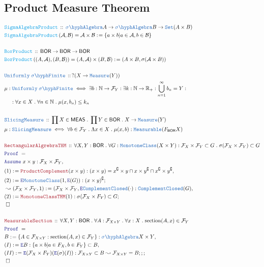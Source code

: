 \documentclass[12pt]{scrartcl}
\newcommand{\TYPE}[1]{\textcolor{NavyBlue}{\mathtt{#1}}}
\newcommand{\FUNC}[1]{\textcolor{Cerulean}{\mathtt{#1}}}
\newcommand{\LOGIC}[1]{\textcolor{Blue}{\mathtt{#1}}}
\newcommand{\THM}[1]{\textcolor{Maroon}{\mathtt{#1}}}
\renewcommand{\.}{\; . \;}
\newcommand{\de}{: \kern 0.1pc =}
\newcommand{\Act}[1]{\left( #1 \right)}
\newcommand{\Theorem}[2]{& \THM{#1} \, :: \, #2 \\ & \Proof = \\ }
\newcommand{\DeclareType}[2]{& \TYPE{#1} \, :: \, #2 \\}
\newcommand{\DefineType}[3]{& #1 : \TYPE{#2} \iff #3 \\}
\newcommand{\DeclareFunc}[2]{& \FUNC{#1} \, :: \, #2 \\}
\newcommand{\DefineNamedFunc}[4]{&  \FUNC{#1}\Act{#2} = #3 \de #4 \\}
\newcommand{\NewLine}{\\ & \kern 1pc}
\newcommand{\Page}[1]{ \begin{align*} #1 \end{align*}   }
\newcommand{\ForEach}[3]{\forall #1 : #2 \. #3 }
\newcommand{\Reals}{\mathbb{R} }
\newcommand{\Nat}{\mathbb{N} }
\newcommand{\Set}{\TYPE{Set}}
\renewcommand{\c}{\complement}
\newcommand{\Say}[3]{& #1 \de #2 : #3, \\}
\newcommand{\Conclude}[3]{& #1 \de #2 : #3; \\}
\newcommand{\Derive}[3]{& \leadsto #1 \de #2 : #3, \\}
\newcommand{\Assume}[2]{& \LOGIC{Assume} \; #1 : #2, \\}
\newcommand{\ByDef}{\LOGIC{E}}
\newcommand{\QED}{\; \square}
\newcommand{\EndProof}{& \QED \\}
\newcommand{\Proof}{\LOGIC{Proof} \; }
\newcommand{\SA}{\TYPE{\sigma \hyph Algebra}}
\newcommand{\B}{\mathcal{B}}
\newcommand{\BOR}{\mathsf{BOR}}
\newcommand{\F}{\mathcal{F}}
\begin{document}
\subsection{Product Measure Theorem }
\Page{
\DeclareFunc{SigmaAlgebraProduct}{\SA{A} \to \SA{B} \to \Set(A \times B)}
\DefineNamedFunc{SigmaAlgebraProduct}{\mathcal{A},\B}{\mathcal{A} \times \B}
{\{ a \times b | a \in \mathcal{A}, b \in \mathcal{B} \}}
\\
\DeclareFunc{BorProduct}{\mathsf{BOR} \to \mathsf{BOR} \to \mathsf{BOR}}
\DefineNamedFunc{BorProduct}{(A,\mathcal{A}),(B,\B)}{(A,\mathcal{A}) \times (B,\B)}
{(A \times B, \sigma(\mathcal{A} \times B))}
\\
\DeclareType{Uniformly \; \sigma \hyph Finite}{ ?(
X \to \TYPE{Measure}(Y) ) }
\DefineType{\mu}{Uniformly \; \sigma \hyph Finite}
{ \exists b : \Nat \to \F_Y : \exists k : \Nat \to \Reals_+ : \bigcup^\infty_{n = 1} b_n = 
Y : \NewLine
 :
\forall x \in X \. \forall n \in \Nat \. \mu(x,b_n) \le k_n }
\\
\DeclareType{SlicingMeasure}{\prod X \in \mathsf{MEAS} \. 
\prod Y \in \BOR \.
X \to \TYPE{Measure}(Y) }
\DefineType{\mu}{SlicingMeasure}
 {\forall b \in \F_Y \. \Lambda x \in X \. \mu(x,b) : \TYPE{Measurable}(F_{\BOR}X)}
 \\
 \Theorem{RectangularAlgrebraTHM}{
 \ForEach{ X, Y}{ \BOR }{ 
 \ForEach{ G}{ \TYPE{MonotoneClass}(X \times Y) : \F_X \times \F_Y \subset G}{  \sigma(\F_X \times \F_Y) \subset G} 
 }}
 \Assume{x \times y}{\F_X \times \F_Y }
 \Say{(1)}{\THM{ProductComplement}(x \times y)}{ (x \times y) = x^\c \times y \cap x \times y^\c \cap x^\c \times y^\c }
 \Conclude{(2)}{\ByDef\TYPE{MonotoneClass}(1,\ByDef(G))}{ (x \times y)^\c }
 \Derive{(\F_X \times \F_Y, 1)}{(\F_X \times \F_Y,\ByDef \TYPE{ComplementClosed}(\cdot)}{\TYPE{ComplementClosed}(G)}
 \Conclude{ (2) }{\THM{MonotoneClassTHM}(1)}{\sigma(\F_X \times F_Y) \subset G}
 \EndProof
 \\ 
 \Theorem{MeasurableSection}{
 \ForEach{ X,Y}{\BOR}{ 
 \ForEach{A}{\F_{X \times Y  }}{ 
 \ForEach{x}{X}{  \mathrm{section}(A,x) \in \F_Y}  
 }}}
 \Say{B}{\{ A \in \F_{X \times Y} : \mathrm{section}(A,x) \in \F_Y \}}{\SA{X \times Y}}
 \Say{(I)}{\ByDef{B}}{ \{ a \times b | a \in F_X , b \in F_Y \}
   \subset  B}
 \Conclude{(II)}{\ByDef(\F_X \times F_Y)(\ByDef(\sigma)(I))}{\F_{X \times Y} \subset B  \leadsto
  \F_{X \times Y} = B ;; 
 }
 \EndProof
}
 \newpage
\end{document}
